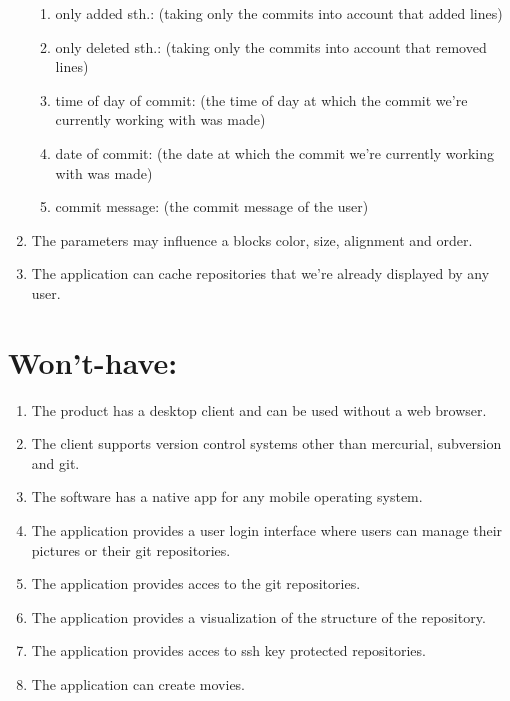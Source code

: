 \documentclass[12pt]{scrartcl}
\begin{document}
\begin{enumerate}
\begin{enumerate}
\item only added sth.:
(taking only the commits into account that added lines)
\item only deleted sth.:
(taking only the commits into account that removed lines)
\item time of day of commit:
(the time of day at which the commit we're currently working with was made)
\item date of commit:
(the date at which the commit we're currently working with was made)
\item commit message:
(the commit message of the user)
\end{enumerate}
\item The parameters may influence a blocks color, size, alignment and order.
\item The application can cache repositories that we're already displayed by any user.
\end{enumerate}
\newpage
\section{Won't-have:}
\begin{enumerate}
\item The product has a desktop client and can be used without a web browser.
\item The client supports version control systems other than mercurial, subversion and git.
\item The software has a native app for any mobile operating system.
\item The application provides a user login interface where users can manage their pictures or their git repositories.
\item The application provides acces to the git repositories.
\item The application provides a visualization of the structure of the repository.
\item The application provides acces to ssh key protected repositories.
\item The application can create movies.
\end{enumerate}
\end{document}
